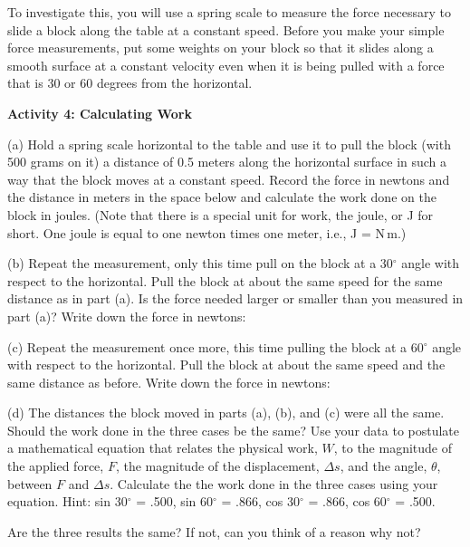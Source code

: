 To investigate this, you will use a spring scale to measure the force necessary
to slide a block along the table at a constant speed. Before you make your simple force measurements, put some weights on your block so that it slides along a smooth surface at a constant velocity even when it is being pulled with a force that is 30 or 60 degrees from the horizontal.

\textbf{Activity 4: Calculating Work} 

(a) Hold a spring scale horizontal to the table and use it to pull the block 
(with 500 grams on it)
a distance of 0.5 meters along the horizontal surface in such a way that the
block moves at a constant speed. Record the force in newtons and the distance
in meters in the space below and calculate the work done on the block in joules.
(Note that there is a special unit for work, the joule, or J for short. One 
joule is equal to one newton times one meter, i.e., J = N\,m.)
\vspace{20mm}

\newpage
(b) Repeat the measurement, only this time pull on the block at a 30\( ^{\circ } \) angle with respect to the horizontal. Pull the block at about the same speed for the same distance as in part (a). Is the force needed larger or smaller than you measured in part (a)? Write down the force in newtons:
\vspace{10mm}

(c) Repeat the measurement once more, this time pulling the block at a 60\( ^{\circ } \) angle with respect to the horizontal.  Pull the block at about the same speed and the same distance as before. Write down the force in newtons:
\vspace{10mm}

(d) The distances the block moved in parts (a), (b), and (c) were all the same.  Should the work done in the three cases be the same?  Use your data to postulate a mathematical equation
that relates the physical work, $W$, to the magnitude of the applied force, $F$,
the magnitude of the displacement, \( \Delta  s\), and the angle, \( \theta  \),
between $F$ and \( \Delta  s\).  Calculate the the work done in the three cases using your equation. 
 Hint: sin 30\( ^{\circ } \) = .500, sin 60\( ^{\circ } \) = .866, cos 30\( ^{\circ } \) = .866, cos 60\( ^{\circ } \)
= .500. 
\vspace{35mm}

Are the three results the same?  If not, can you think of a reason why not?
\vspace{25mm}

